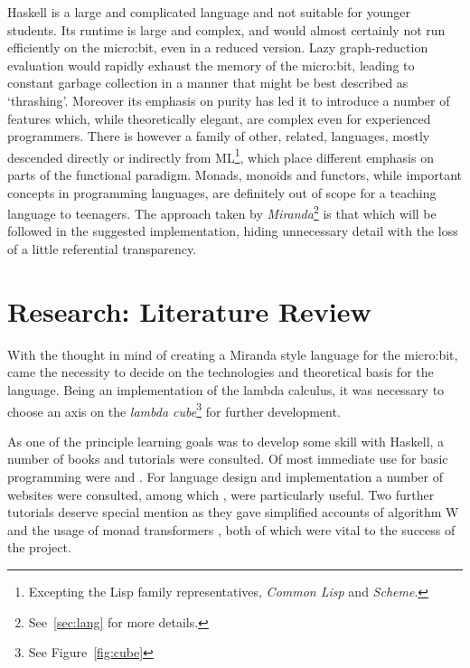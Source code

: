 \documentclass[12pt, a4paper]{report}
\begin{document}
Haskell is a large and complicated language and not suitable for younger students. Its runtime
is large and complex, and would almost certainly not run efficiently on the micro:bit, even
in a reduced version. Lazy graph-reduction evaluation would rapidly exhaust the memory of the
micro:bit, leading to constant garbage collection in a manner that might be best described as
`thrashing'. Moreover its emphasis on purity has led it to introduce a number of features which,
while theoretically elegant, are complex even for experienced programmers. There is however a family
of other, related, languages, mostly descended directly or indirectly from ML\footnote{Excepting
the Lisp family representatives, \textit{Common Lisp} and \textit{Scheme}.}, which place different
emphasis on parts of the functional paradigm. Monads, monoids and functors, while important concepts
in programming languages, are definitely out of scope for a teaching language to teenagers. The
approach taken by \textit{Miranda}\footnote{See~\ref{sec:lang} for more details.} is that which will
be followed in the suggested implementation, hiding unnecessary detail with the loss of a little
referential transparency.

\section{Research: Literature Review}
With the thought in mind of creating a Miranda style language for the micro:bit, came the necessity
to decide on the technologies and theoretical basis for the language. Being an implementation of the
lambda calculus, it was necessary to choose an axis on the \textit{lambda cube}\footnote{See
Figure~\ref{fig:cube}} for further development. 

As one of the principle learning goals was to develop some skill with Haskell, a number of books and
tutorials were consulted. Of most immediate use for basic programming were \cite{Lipovaca:2011:LYH:2018642}
and \cite{rwh}. For language design and implementation a number of websites were consulted, among which
\cite{scheme}, \cite{diehl} were particularly useful. Two further tutorials deserve special mention
as they gave simplified accounts of algorithm W \cite{algoW} and the usage of monad transformers
\cite{transformers}, both of which were vital to the success of the project.
\end{document}
